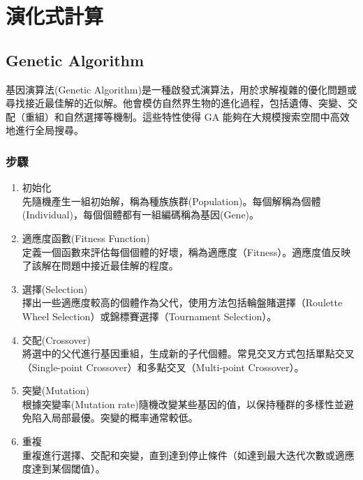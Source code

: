 \chapter{演化式計算}
\section{Genetic Algorithm}
基因演算法(Genetic Algorithm)是一種啟發式演算法，用於求解複雜的優化問題或尋找接近最佳解的近似解。他會模仿自然界生物的進化過程，包括遺傳、突變、交配（重組）和自然選擇等機制。這些特性使得 GA 能夠在大規模搜索空間中高效地進行全局搜尋。
\subsection{步驟}
\begin{enumerate}
    \item 初始化 \\
        先隨機產生一組初始解，稱為種族族群(Population)。每個解稱為個體(Individual)，每個個體都有一組編碼稱為基因(Gene)。
    \item 適應度函數(Fitness Function) \\
        定義一個函數來評估每個個體的好壞，稱為適應度（Fitness）。適應度值反映了該解在問題中接近最佳解的程度。
    \item 選擇(Selection) \\
        擇出一些適應度較高的個體作為父代，使用方法包括輪盤賭選擇（Roulette Wheel Selection）或錦標賽選擇（Tournament Selection）。
    \item 交配(Crossover) \\
        將選中的父代進行基因重組，生成新的子代個體。常見交叉方式包括單點交叉（Single-point Crossover）和多點交叉（Multi-point Crossover）。
    \item 突變(Mutation) \\
        根據突變率(Mutation rate)隨機改變某些基因的值，以保持種群的多樣性並避免陷入局部最優。突變的概率通常較低。
    \item 重複 \\
        重複進行選擇、交配和突變，直到達到停止條件（如達到最大迭代次數或適應度達到某個閾值）。

\begin{figure}[ht]
\centering
{}
\end{figure}
\end{enumerate}
